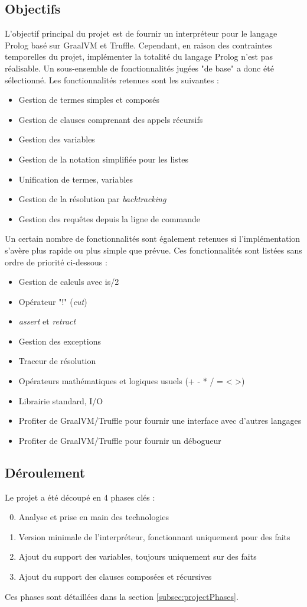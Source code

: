 \documentclass[../report.tex]{subfiles}
\begin{document}
\subsection{Objectifs}\label{subsec:projetobjectives}
L'objectif principal du projet est de fournir un interpréteur pour le langage Prolog basé sur GraalVM et Truffle. Cependant, en raison des contraintes temporelles du projet, implémenter la totalité du langage Prolog n'est pas réalisable. Un sous-ensemble de fonctionnalités jugées "de base" a donc été sélectionné. Les fonctionnalités retenues sont les suivantes :
\begin{itemize}
    \item Gestion de termes simples et composés
    \item Gestion de clauses comprenant des appels récursifs
    \item Gestion des variables
    \item Gestion de la notation simplifiée pour les listes
    \item Unification de termes, variables
    \item Gestion de la résolution par \textit{backtracking}
    \item Gestion des requêtes depuis la ligne de commande
\end{itemize}
Un certain nombre de fonctionnalités sont également retenues si l'implémentation s'avère plus rapide ou plus simple que prévue. Ces fonctionnalités sont listées sans ordre de priorité ci-dessous :
\begin{itemize}
  \item Gestion de calculs avec is/2
  \item Opérateur "!" (\textit{cut})
  \item \textit{assert} et \textit{retract}
  \item Gestion des exceptions
  \item Traceur de résolution
  \item Opérateurs mathématiques et logiques usuels (+ - * / = < >)
  \item Librairie standard, I/O
  \item Profiter de GraalVM/Truffle pour fournir une interface avec d'autres langages
  \item Profiter de GraalVM/Truffle pour fournir un débogueur
\end{itemize}
\subsection{Déroulement}
Le projet a été découpé en 4 phases clés :
\begin{enumerate}
    \setcounter{enumi}{-1}
    \item Analyse et prise en main des technologies
    \item Version minimale de l'interpréteur, fonctionnant uniquement pour des faits
    \item Ajout du support des variables, toujours uniquement sur des faits
    \item Ajout du support des clauses composées et récursives
\end{enumerate}
Ces phases sont détaillées dans la section \ref{subsec:projectPhases}.
\end{document}
